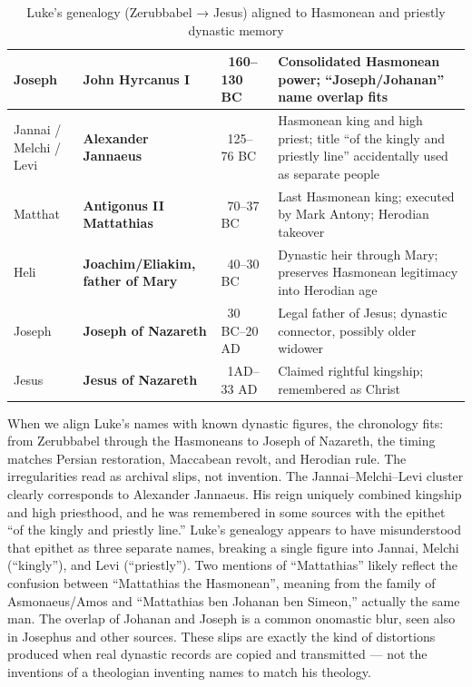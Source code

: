 \begin{table}[h]
\begin{tabular}{|l|p{3.4cm}|p{2.8cm}|p{6.6cm}|}
        Joseph & \textbf{John Hyrcanus I} & ~160--130 BC & Consolidated Hasmonean power; “Joseph/Johanan” name overlap fits \\ \hline
        Jannai / Melchi / Levi & \textbf{Alexander Jannaeus} & ~125--76 BC & Hasmonean king and high priest; title ``of the kingly and priestly line'' accidentally used as separate people \\ \hline
        Matthat & \textbf{Antigonus II Mattathias} & ~70--37 BC & Last Hasmonean king; executed by Mark Antony; Herodian takeover \\ \hline
        Heli & \textbf{Joachim/Eliakim, father of Mary} & ~40--30 BC & Dynastic heir through Mary; preserves Hasmonean legitimacy into Herodian age \\ \hline
        Joseph & \textbf{Joseph of Nazareth} & ~30 BC--20 AD & Legal father of Jesus; dynastic connector, possibly older widower \\ \hline
        Jesus & \textbf{Jesus of Nazareth} & ~1AD--33 AD & Claimed rightful kingship; remembered as Christ \\ \hline
    \end{tabular}
    \caption{Luke’s genealogy (Zerubbabel → Jesus) aligned to Hasmonean and priestly dynastic memory}
    \label{tab:luke_corrected}
\end{table}

When we align Luke’s names with known dynastic figures, the chronology fits: from Zerubbabel through the Hasmoneans to Joseph of Nazareth, the timing matches Persian restoration, Maccabean revolt, and Herodian rule.
The irregularities read as archival slips, not invention.
The Jannai--Melchi--Levi cluster clearly corresponds to Alexander Jannaeus.
His reign uniquely combined kingship and high priesthood, and he was remembered in some sources with the epithet ``of the kingly and priestly line.''
Luke’s genealogy appears to have misunderstood that epithet as three separate names, breaking a single figure into Jannai, Melchi (``kingly''), and Levi (``priestly'').
Two mentions of ``Mattathias'' likely reflect the confusion between ``Mattathias the Hasmonean'', meaning from the family of Asmonaeus/Amos and ``Mattathias ben Johanan ben Simeon,'' actually the same man.
The overlap of Johanan and Joseph is a common onomastic blur, seen also in Josephus and other sources.
These slips are exactly the kind of distortions produced when real dynastic records are copied and transmitted --- not the inventions of a theologian inventing names to match his theology.

